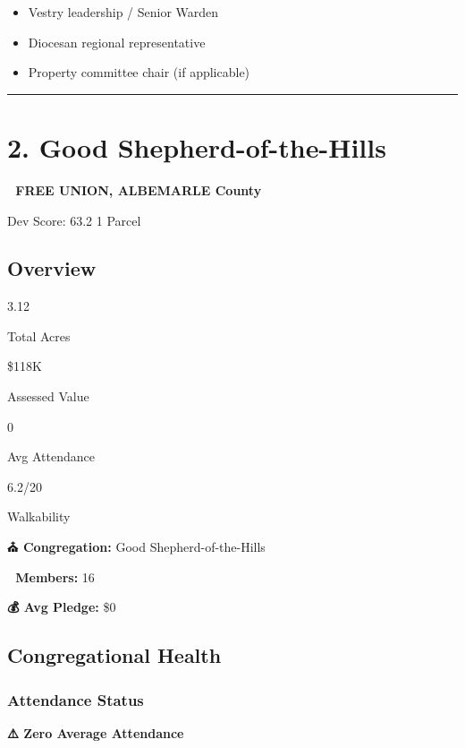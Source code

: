 \documentclass[
  letterpaper,
  DIV=11,
  numbers=noendperiod,
  oneside]{scrreprt}
\providecommand{\tightlist}{%
  \setlength{\itemsep}{0pt}\setlength{\parskip}{0pt}}
\begin{document}
\begin{itemize}
\tightlist
\item[$\square$]
  Vestry leadership / Senior Warden
\item[$\square$]
  Diocesan regional representative
\item[$\square$]
  Property committee chair (if applicable)
\end{itemize}

\begin{center}\rule{0.5\linewidth}{0.5pt}\end{center}

\section*{2. Good
Shepherd-of-the-Hills}\label{good-shepherd-of-the-hills}


\textbf{📍 FREE UNION, ALBEMARLE County}

{Dev Score: 63.2} {1 Parcel}

\subsection{Overview}

{3.12}

{Total Acres}

{\$118K}

{Assessed Value}

{0}

{Avg Attendance}

{6.2/20}

{Walkability}

\textbf{⛪ Congregation:} Good Shepherd-of-the-Hills

\textbf{👥 Members:} 16

\textbf{💰 Avg Pledge:} \$0

\subsection{Congregational Health}

\subsubsection{Attendance Status}\label{attendance-status-1}

\textbf{⚠️ Zero Average Attendance}
\end{document}
